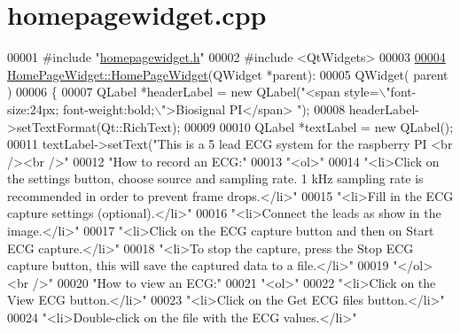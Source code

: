 \hypertarget{homepagewidget_8cpp_source}{}\section{homepagewidget.\+cpp}
\label{homepagewidget_8cpp_source}

\begin{DoxyCode}
00001 \textcolor{preprocessor}{#include "\hyperlink{homepagewidget_8h}{homepagewidget.h}"}
00002 \textcolor{preprocessor}{#include <QtWidgets>}
00003 
\hypertarget{homepagewidget_8cpp_source.tex_l00004}{}\hyperlink{classHomePageWidget_a72947da81d3ac3ce6edc9da05fd809ac}{00004} \hyperlink{classHomePageWidget_a72947da81d3ac3ce6edc9da05fd809ac}{HomePageWidget::HomePageWidget}(QWidget *parent):
00005     QWidget( parent )
00006 \{
00007     QLabel *headerLabel = \textcolor{keyword}{new} QLabel(\textcolor{stringliteral}{"<span style=\(\backslash\)"font-size:24px; font-weight:bold;\(\backslash\)">Biosignal PI</span>
      "});
00008     headerLabel->setTextFormat(Qt::RichText);
00009 
00010     QLabel *textLabel = \textcolor{keyword}{new} QLabel();
00011     textLabel->setText(\textcolor{stringliteral}{"This is a 5 lead ECG system for the raspberry PI <br /><br />"}
00012                        \textcolor{stringliteral}{"How to record an ECG:"}
00013                        \textcolor{stringliteral}{"<ol>"}
00014                        \textcolor{stringliteral}{"<li>Click on the settings button, choose source and sampling rate. 1 kHz sampling
       rate is recommended in order to prevent frame drops.</li>"}
00015                        \textcolor{stringliteral}{"<li>Fill in the ECG capture settings (optional).</li>"}
00016                        \textcolor{stringliteral}{"<li>Connect the leads as show in the image.</li>"}
00017                        \textcolor{stringliteral}{"<li>Click on the ECG capture button and then on Start ECG capture.</li>"}
00018                        \textcolor{stringliteral}{"<li>To stop the capture, press the Stop ECG capture button, this will save the
       captured data to a file.</li>"}
00019                        \textcolor{stringliteral}{"</ol> <br />"}
00020                        \textcolor{stringliteral}{"How to view an ECG:"}
00021                        \textcolor{stringliteral}{"<ol>"}
00022                        \textcolor{stringliteral}{"<li>Click on the View ECG button.</li>"}
00023                        \textcolor{stringliteral}{"<li>Click on the Get ECG files button.</li>"}
00024                        \textcolor{stringliteral}{"<li>Double-click on the file with the ECG values.</li>"}

\end{DoxyCode}
